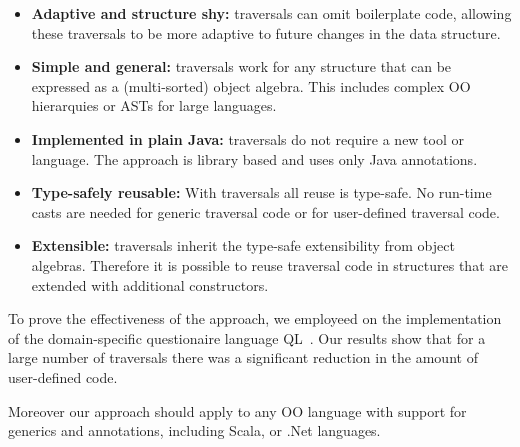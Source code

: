 \begin{itemize}

\item {\bf Adaptive and structure shy:} \name traversals can omit boilerplate
code, allowing these traversals to be more adaptive to future changes in the 
data structure.

\item {\bf Simple and general:} \name traversals work for any
  structure that can be expressed as a (multi-sorted) object
  algebra. This includes complex OO hierarquies or ASTs for large
  languages.

\item {\bf Implemented in plain Java:} \name traversals do not require
  a new tool or language. The approach is library based and uses only
  Java annotations. 

\item {\bf Type-safely reusable:} With \name traversals all reuse is
  type-safe. No run-time casts are needed for generic traversal code
  or for user-defined traversal code.

\item {\bf Extensible:} \name traversals inherit the type-safe
  extensibility from object algebras. Therefore it is possible to
  reuse traversal code in structures that are extended with additional
  constructors.

\end{itemize}

To prove the effectiveness of the approach, we employeed \name 
on the implementation of the domain-specific questionaire 
language QL~\cite{}. Our results show that for a large number of traversals 
there was a significant reduction in the amount of user-defined code.

Moreover our approach should apply to any OO language 
  with support for generics and annotations, including Scala, or .Net languages.

